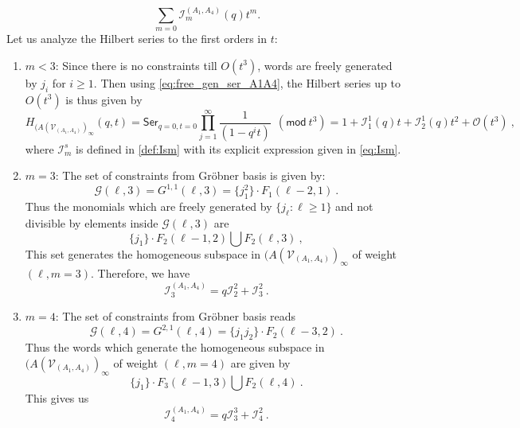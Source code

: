 \documentclass[a4paper,10pt]{article}
\newcommand{\mr}[1]{\mathsf{#1}}
\begin{document}
\begin{appendix}
\begin{equation}
    \sum_{m = 0}\mathcal{I}_m^{(A_1, A_4)}(q)t^m.
\end{equation}
Let us analyze the Hilbert series to the first orders in $t$:
\begin{enumerate}
    \item $m<3$:
    Since there is no constraints till $O(t^3)$, words are freely generated by $j_i$ for $i \geq 1.$ Then using \eqref{eq:free_gen_ser_A1A4}, the Hilbert series up to $O(t^3)$ is thus given by 
    \begin{equation}
        H_{(A(\mathcal{V}_{(A_1,A_4)})_\infty}(q,t)=\mr{Ser}_{q=0,t=0}\prod_{j=1}^\infty\frac{1}{(1-q^it)}~~(\mr{mod}~t^3)= 1 + \mathcal{I}_1^1(q)t + \mathcal{I}^1_2 (q)t^2 + \mathcal{O}(t^3)~,
    \end{equation}
    where $\mathcal{I}_m^s$ is defined in \eqref{def:Ism} with its explicit expression given in \eqref{eq:Ism}.
    \item $m=3$:
    The set of constraints from Gr\"{o}bner basis is given by:
    \begin{equation}
        \mathcal{G}(\ell,3) =G^{1,1}(\ell,3) = \{j_1^2\}\cdot F_1(\ell-2,1)~.
    \end{equation}
    Thus the monomials which are freely generated by $\{j_\ell: \ell\geq1\}$ and not divisible by elements inside $\mathcal{G}(\ell,3)$ are
    \begin{equation}
        \{j_1\}\cdot F_2(\ell-1,2) \bigcup F_2(\ell,3)~,
    \end{equation}
   This set generates the homogeneous subspace in $(A(\mathcal{V}_{(A_1,A_4)})_\infty$ of weight $(\ell,m =3)$. Therefore, we have
    \begin{equation}
        \mathcal{I}^{(A_1,A_4)}_3 = q \mathcal{I}_{2}^{2} + \mathcal{I}_3^2~.
    \end{equation}
    \item $m =4$:
    The set of constraints from Gr\"{o}bner basis reads
    \begin{equation}
        \mathcal{G}(\ell,4) =G^{2,1}(\ell,4) = \{j_1j_2\}\cdot F_2(\ell-3,2)~.
    \end{equation}
    Thus the words which generate the homogeneous subspace in $(A(\mathcal{V}_{(A_1,A_4)})_\infty$ of weight $(\ell,m =4)$ are given by 
    \begin{equation}
        \{j_1\}\cdot F_3(\ell-1,3) \bigcup F_2(\ell,4)~.
    \end{equation}
   This gives us
\begin{equation}
\mathcal{I}^{(A_1,A_4)}_4 = q \mathcal{I}_{3}^{3} + \mathcal{I}_4^2~.

\end{equation}
\end{enumerate}
\end{appendix}
\end{document}

